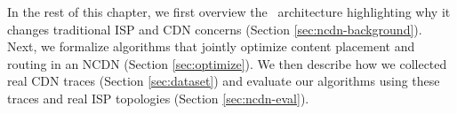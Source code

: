 


In the rest of this chapter, we first overview the \ncp\ architecture highlighting why it changes traditional ISP and CDN concerns (Section \ref{sec:ncdn-background}). Next, we formalize algorithms that jointly optimize content placement and routing in an NCDN (Section \ref{sec:optimize}). We then describe how we collected real CDN traces (Section \ref{sec:dataset}) and evaluate our algorithms using these traces and real ISP topologies (Section \ref{sec:ncdn-eval}). 



